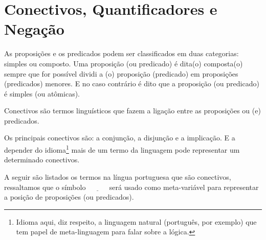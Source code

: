 \section{Conectivos, Quantificadores e Negação}\label{sec:LogicsConnectives}

As proposições e os predicados podem ser classificados em duas categorias: simples ou composto. Uma proposição (ou predicado) é dita(o) composta(o) sempre que for possível dividi a (o) proposição (predicado) em proposições (predicados) menores. E no caso contrário é dito que a proposição (ou predicado) é simples (ou atômicas).

\begin{definicao}[Conectivos]\label{def:Conectivos}
	Conectivos são termos linguísticos que fazem a ligação entre as proposições ou (e) predicados.
\end{definicao}

Os principais conectivos são: a conjunção, a disjunção e a implicação. E a depender do idioma\footnote{Idioma aqui, diz respeito, a linguagem natural (português, por exemplo) que tem papel de meta-linguagem para falar sobre a lógica.} mais de um termo da linguagem pode representar um determinado conectivos.

A seguir são listados os termos na língua portuguesa que são conectivos, ressaltamos que o símbolo $\underline{ \ \ \ \ \ \ \ \ \ \ \ \ }$ será usado como meta-variável para representar a posição de proposições (ou predicados).


